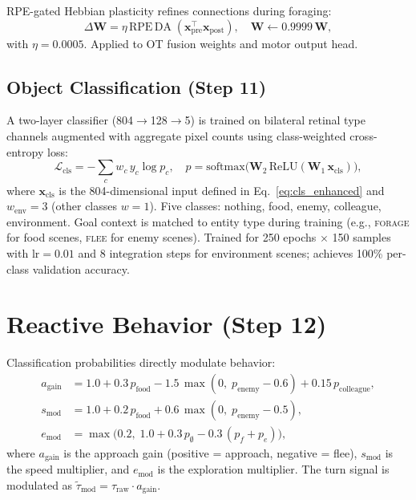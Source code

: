 \documentclass[11pt,a4paper]{article}
\begin{document}
RPE-gated Hebbian plasticity refines connections during foraging:
\begin{equation}\label{eq:hebbian}
  \Delta\mathbf{W} = \eta\,\text{RPE}\,\text{DA}\;
    (\mathbf{x}_\text{pre}^\top \mathbf{x}_\text{post}),
  \quad
  \mathbf{W} \leftarrow 0.9999\,\mathbf{W},
\end{equation}
with $\eta = 0.0005$.
Applied to OT fusion weights and motor output head.

\subsection{Object Classification (Step 11)}

A two-layer classifier (804$\to$128$\to$5) is trained on bilateral retinal type
channels augmented with aggregate pixel counts using class-weighted
cross-entropy loss:
\begin{equation}\label{eq:cls_loss}
  \mathcal{L}_\text{cls} = -\sum_c w_c\, y_c \log p_c,
  \quad
  p = \text{softmax}\bigl(\mathbf{W}_2\,\text{ReLU}(\mathbf{W}_1\,\mathbf{x}_\text{cls})\bigr),
\end{equation}
where $\mathbf{x}_\text{cls}$ is the 804-dimensional input defined in
Eq.~\ref{eq:cls_enhanced} and $w_\text{env} = 3$ (other classes $w = 1$).
Five classes: nothing, food, enemy, colleague, environment.
Goal context is matched to entity type during training (e.g., \textsc{forage}
for food scenes, \textsc{flee} for enemy scenes).
Trained for 250 epochs $\times$ 150 samples with $\text{lr} = 0.01$
and 8 integration steps for environment scenes;
achieves 100\% per-class validation accuracy.

\section{Reactive Behavior (Step 12)}\label{sec:reactive}

Classification probabilities directly modulate behavior:
\begin{equation}\label{eq:reactive}
\begin{aligned}
  a_\text{gain} &= 1.0 + 0.3\,p_\text{food}
    - 1.5\,\max(0,\; p_\text{enemy} - 0.6) + 0.15\,p_\text{colleague}, \\
  s_\text{mod} &= 1.0 + 0.2\,p_\text{food} + 0.6\,\max(0,\; p_\text{enemy} - 0.5), \\
  e_\text{mod} &= \max\!\bigl(0.2,\; 1.0 + 0.3\,p_\emptyset - 0.3\,(p_f + p_e)\bigr),
\end{aligned}
\end{equation}
where $a_\text{gain}$ is the approach gain (positive = approach, negative =
flee), $s_\text{mod}$ is the speed multiplier, and $e_\text{mod}$ is the
exploration multiplier.
The turn signal is modulated as $\tilde{\tau}_\text{mod} = \tau_\text{raw} \cdot a_\text{gain}$.
\end{document}
